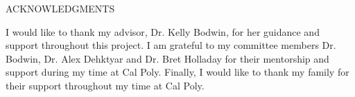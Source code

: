 \begin{center}
ACKNOWLEDGMENTS
\end{center}

I would like to thank my advisor, Dr. Kelly Bodwin, for her guidance and support throughout this project. 
I am grateful to my committee members Dr. Bodwin, Dr. Alex Dehktyar and Dr. Bret Holladay for their mentorship and support during my time at Cal Poly. 
Finally, I would like to thank my family for their support throughout my time at Cal Poly.

\clearpage